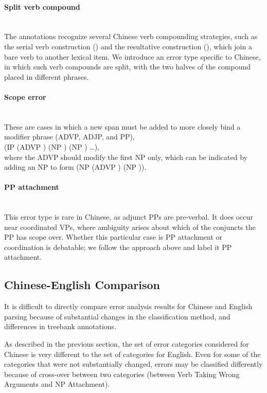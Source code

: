 \paragraph{Split verb compound} \strut \\
The \pctb annotations recognize several
Chinese verb compounding strategies, such as the serial verb construction
(\mbox{}) and the resultative construction
(\mbox{}), which join a bare verb to another
lexical item.  We introduce an error type specific to Chinese, in which such
verb compounds are split, with the two halves of the compound placed in
different phrases.

\paragraph{Scope error} \strut \\
These are cases in which a new span must be added to more closely bind a modifier phrase (ADVP, ADJP, and PP), \myeg \\
(IP (ADVP \mbox{}) (NP \mbox{}) (NP \mbox{}) \ldots), \\
where the ADVP should modify the first NP only, which can be indicated by adding an NP to form (NP (ADVP \mbox{}) (NP \mbox{})).

\paragraph{PP attachment} \strut \\
This error type is rare in Chinese, as adjunct PPs are pre-verbal.  It does
occur near coordinated VPs, where ambiguity arises about which of the conjuncts
the PP has scope over.  Whether this particular case is PP attachment or
coordination is debatable; we follow the approach above and
label it PP attachment.

\subsection{Chinese-English Comparison} \label{subsec:chinese_english_comparison}

It is difficult to directly compare error analysis results for Chinese and
English parsing because of substantial changes in the classification method,
and differences in treebank annotations.

As described in the previous section, the set of error categories considered for Chinese is very different to the set of categories for English.  
Even for some of the categories that were not substantially changed, errors may be classified differently because of cross-over between two categories (\myeg between Verb Taking Wrong Arguments and NP Attachment).

